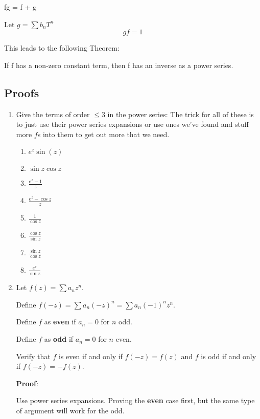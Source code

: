 \begin{thm}
  \; fg = \; f + \; g
\end{thm}

\begin{defn}
  Let $g = \sum b_n T^n$
  \[gf = 1\]
\end{defn}
This leads to the following Theorem:
\begin{thm}
  If f has a non-zero constant term, then f has an inverse as a power series.
\end{thm}

\subsection{Proofs}
\begin{enumerate}
  \item Give the terms of order $\leq 3$ in the power series:
  The trick for all of these is to just use their power series expansions or use ones we've found and stuff more $f$s into them 
  to get out more that we need.
  \begin{enumerate}
    \item $e^z \sin(z)$
    \item $\sin z \cos z$
    \item $\frac{e^z - 1}{z}$
    \item $\frac{e^z - \cos z}{z}$
    \item $\frac{1}{\cos z}$
    \item $\frac{\cos z}{\sin z}$
    \item $\frac{\sin z}{\cos z}$
    \item $\frac{e^z}{\sin z}$
  \end{enumerate}
  
  \item Let $f(z) = \sum a_n z^n$.

  Define $f(-z) = \sum a_n (-z)^n = \sum a_n(-1)^n z^n$.

  Define $f$ as \textbf{even} if $a_n = 0$ for $n$ odd.

  Define $f$ as \textbf{odd} if $a_n = 0$ for $n$ even.

  Verify that $f$ is even if and only if $f(-z) = f(z)$ and $f$ is odd if and only if $f(-z) = -f(z).$

  \textbf{Proof}:

  Use power series expansions. Proving the \textbf{even} case first, but the same type of argument will work for the odd.


\end{enumerate}
